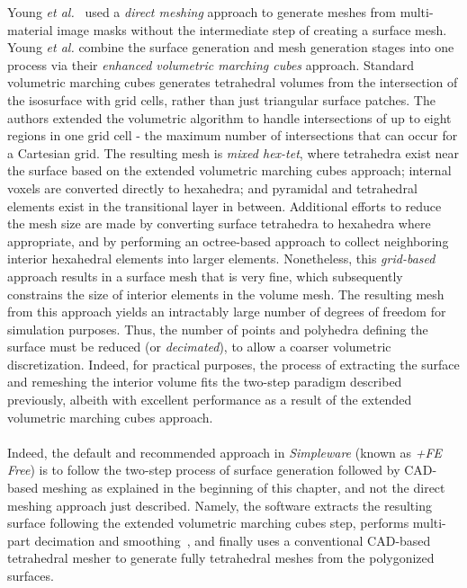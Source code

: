 %
Young \textit{et al.}~\cite{young_2008} used a \textit{direct meshing} approach to generate meshes from multi-material image masks without the intermediate step of creating a surface mesh. Young \textit{et al.} combine the surface generation and mesh generation stages into one process via their \textit{enhanced volumetric marching cubes} approach. Standard volumetric marching cubes generates tetrahedral volumes from the intersection of the isosurface with grid cells, rather than just triangular surface patches. The authors extended the volumetric algorithm to handle intersections of up to eight regions in one grid cell - the maximum number of intersections that can occur for a Cartesian grid. The resulting mesh is \textit{mixed hex-tet}, where tetrahedra exist near the surface based on the extended volumetric marching cubes approach; internal voxels are converted directly to hexahedra; and pyramidal and tetrahedral elements exist in the transitional layer in between. Additional efforts to reduce the mesh size are made by converting surface tetrahedra to hexahedra where appropriate, and by performing an octree-based approach to collect neighboring interior hexahedral elements into larger elements. Nonetheless, this \textit{grid-based} approach results in a surface mesh that is very fine, which subsequently constrains the size of interior elements in the volume mesh. The resulting mesh from this approach yields an intractably large number of degrees of freedom for simulation purposes. Thus, the number of points and polyhedra defining the surface must be reduced (or \textit{decimated}), to allow a coarser volumetric discretization. Indeed, for practical purposes, the process of extracting the surface and remeshing the interior volume fits the two-step paradigm described previously, albeith with excellent performance as a result of the extended volumetric marching cubes approach.\\ \\
%
Indeed, the default and recommended approach in \textit{Simpleware} (known as \textit{+FE Free}) is to follow the two-step process of surface generation followed by CAD-based meshing as explained in the beginning of this chapter, and not the direct meshing approach just described. Namely, the software extracts the resulting surface following the extended volumetric marching cubes step, performs multi-part decimation and smoothing~\cite{egst}, and finally uses a conventional CAD-based tetrahedral mesher to generate fully tetrahedral meshes from the polygonized surfaces. \\ \\
